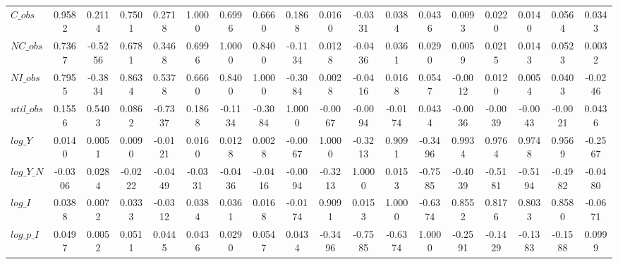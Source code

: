 \begin{center}
\begin{longtable}{lccccccccccccccccc}
$C\_obs     $	 & 	       0.9582	 & 	       0.2114	 & 	       0.7501	 & 	       0.2718	 & 	       1.0000	 & 	       0.6996	 & 	       0.6660	 & 	       0.1868	 & 	       0.0160	 & 	      -0.0331	 & 	       0.0384	 & 	       0.0436	 & 	       0.0093	 & 	       0.0220	 & 	       0.0140	 & 	       0.0564	 & 	       0.0343 \\ 
$NC\_obs    $	 & 	       0.7367	 & 	      -0.5256	 & 	       0.6781	 & 	       0.3468	 & 	       0.6996	 & 	       1.0000	 & 	       0.8400	 & 	      -0.1134	 & 	       0.0128	 & 	      -0.0436	 & 	       0.0361	 & 	       0.0290	 & 	       0.0059	 & 	       0.0215	 & 	       0.0143	 & 	       0.0523	 & 	       0.0032 \\ 
$NI\_obs    $	 & 	       0.7955	 & 	      -0.3834	 & 	       0.8634	 & 	       0.5378	 & 	       0.6660	 & 	       0.8400	 & 	       1.0000	 & 	      -0.3084	 & 	       0.0028	 & 	      -0.0416	 & 	       0.0168	 & 	       0.0547	 & 	      -0.0012	 & 	       0.0120	 & 	       0.0054	 & 	       0.0403	 & 	      -0.0246 \\ 
$util\_obs  $	 & 	       0.1556	 & 	       0.5403	 & 	       0.0862	 & 	      -0.7337	 & 	       0.1868	 & 	      -0.1134	 & 	      -0.3084	 & 	       1.0000	 & 	      -0.0067	 & 	      -0.0094	 & 	      -0.0174	 & 	       0.0434	 & 	      -0.0036	 & 	      -0.0039	 & 	      -0.0043	 & 	      -0.0021	 & 	       0.0436 \\ 
$log\_Y     $	 & 	       0.0140	 & 	       0.0051	 & 	       0.0090	 & 	      -0.0121	 & 	       0.0160	 & 	       0.0128	 & 	       0.0028	 & 	      -0.0067	 & 	       1.0000	 & 	      -0.3213	 & 	       0.9091	 & 	      -0.3496	 & 	       0.9934	 & 	       0.9764	 & 	       0.9748	 & 	       0.9569	 & 	      -0.2567 \\ 
$log\_Y\_N  $	 & 	      -0.0306	 & 	       0.0284	 & 	      -0.0222	 & 	      -0.0449	 & 	      -0.0331	 & 	      -0.0436	 & 	      -0.0416	 & 	      -0.0094	 & 	      -0.3213	 & 	       1.0000	 & 	       0.0153	 & 	      -0.7585	 & 	      -0.4039	 & 	      -0.5181	 & 	      -0.5194	 & 	      -0.4982	 & 	      -0.0480 \\ 
$log\_I     $	 & 	       0.0388	 & 	       0.0072	 & 	       0.0333	 & 	      -0.0312	 & 	       0.0384	 & 	       0.0361	 & 	       0.0168	 & 	      -0.0174	 & 	       0.9091	 & 	       0.0153	 & 	       1.0000	 & 	      -0.6374	 & 	       0.8552	 & 	       0.8176	 & 	       0.8033	 & 	       0.8580	 & 	      -0.0671 \\ 
$log\_p\_I  $	 & 	       0.0497	 & 	       0.0052	 & 	       0.0511	 & 	       0.0445	 & 	       0.0436	 & 	       0.0290	 & 	       0.0547	 & 	       0.0434	 & 	      -0.3496	 & 	      -0.7585	 & 	      -0.6374	 & 	       1.0000	 & 	      -0.2591	 & 	      -0.1429	 & 	      -0.1383	 & 	      -0.1588	 & 	       0.0999 \\ 

\end{longtable}
\end{center}

